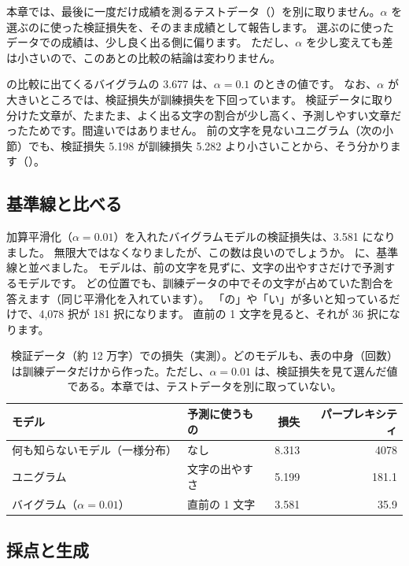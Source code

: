 本章では、最後に一度だけ成績を測るテストデータ（）を別に取りません。$\alpha$ を選ぶのに使った検証損失を、そのまま成績として報告します。
選ぶのに使ったデータでの成績は、少し良く出る側に偏ります。
ただし、$\alpha$ を少し変えても差は小さいので、このあとの比較の結論は変わりません。

の比較に出てくるバイグラムの 3.677 は、$\alpha=0.1$ のときの値です。
なお、$\alpha$ が大きいところでは、検証損失が訓練損失を下回っています。
検証データに取り分けた文章が、たまたま、よく出る文字の割合が少し高く、予測しやすい文章だったためです。間違いではありません。
前の文字を見ないユニグラム（次の小節）でも、検証損失 5.198 が訓練損失 5.282 より小さいことから、そう分かります（）。

\subsection*{基準線と比べる}

加算平滑化（$\alpha=0.01$）を入れたバイグラムモデルの検証損失は、3.581 になりました。
無限大ではなくなりましたが、この数は良いのでしょうか。
に、基準線と並べました。
モデルは、前の文字を見ずに、文字の出やすさだけで予測するモデルです。
どの位置でも、訓練データの中でその文字が占めていた割合を答えます（同じ平滑化を入れています）。
「の」や「い」が多いと知っているだけで、4,078 択が 181 択になります。
直前の 1 文字を見ると、それが 36 択になります。

\begin{table}[htbp]
\centering
\caption{検証データ（約 12 万字）での損失（実測）。どのモデルも、表の中身（回数）は訓練データだけから作った。ただし、$\alpha=0.01$ は、検証損失を見て選んだ値である。本章では、テストデータを別に取っていない。}
\label{tab:lm-baseline}
\small
\begin{tabular}{llrr}
\toprule
モデル & 予測に使うもの & 損失 & パープレキシティ \\
\midrule
何も知らないモデル（一様分布） & なし & 8.313 & 4078 \\
ユニグラム & 文字の出やすさ & 5.199 & 181.1 \\
バイグラム（$\alpha=0.01$） & 直前の 1 文字 & 3.581 & 35.9 \\
\bottomrule
\end{tabular}
\end{table}

\subsection*{採点と生成}

